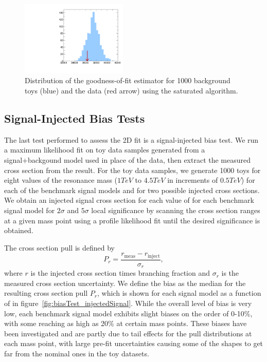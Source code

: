 \begin{figure}[htbp]
  \centering
  \includegraphics[width=0.45\textwidth]{fig/fitValidation/saturated_WprToWH1000.pdf}
  \caption{
    Distribution of the goodness-of-fit estimator for 1000 background toys (blue) and the data (red arrow) using the saturated algorithm.
  }
  \label{fig:GOF}
\end{figure}

\subsection{Signal-Injected Bias Tests}

The last test performed to assess the 2D fit is a signal-injected bias test.
We run a maximum likelihood fit on toy data samples generated from a signal+backgound model used in place of the data, then extract the measured cross section from the result.
For the toy data samples, we generate 1000 toys for eight values of the resonance mass \MX ($1\unit{TeV}$ to $4.5\unit{TeV}$ in increments of $0.5\unit{TeV}$) for each of the benchmark signal models and for two possible injected cross sections.
We obtain an injected signal cross section for each value of \MX for each benchmark signal model for $2\sigma$ and $5\sigma$ local significance by scanning the cross section ranges at a given mass point \MX using a profile likelihood fit until the desired significance is obtained.

The cross section pull is defined by
\begin{equation}
  P_r=\frac{r_\mathrm{meas}-r_\mathrm{inject}}{\sigma_r},
\end{equation}
where $r$ is the injected cross section times branching fraction and $\sigma_r$ is the measured cross section uncertainty.
We define the bias as the median for the resulting cross section pull $P_r$, which is shown for each signal model as a function of \MX in figure~\ref{fig:biasTest_injectedSignal}.
While the overall level of bias is very low, each benchmark signal model exhibits slight biases on the order of 0-10\%, with some reaching as high as 20\% at certain mass points.
These biases have been investigated and are partly due to tail effects for the pull distributions at each mass point, with large pre-fit uncertainties causing some of the shapes to get far from the nominal ones in the toy datasets.

